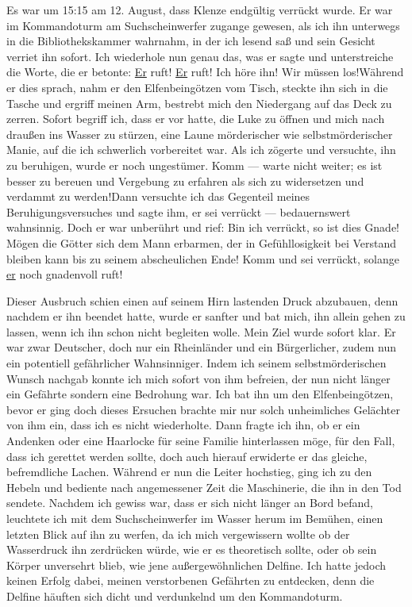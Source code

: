 \documentclass[a4paper]{memoir}
\begin{document}
Es war um 15:15 am 12. August, dass Klenze endgültig verrückt wurde. Er war im Kommandoturm am Suchscheinwerfer zugange gewesen, als ich ihn unterwegs in die Bibliothekskammer wahrnahm, in der ich lesend saß und sein Gesicht verriet ihn sofort. Ich wiederhole nun genau das, was er sagte und unterstreiche die Worte, die er betonte: \glqq\underline{Er} ruft! \underline{Er} ruft! Ich höre ihn! Wir müssen los!\grqq Während er dies sprach, nahm er den Elfenbeingötzen vom Tisch, steckte ihn sich in die Tasche und ergriff meinen Arm, bestrebt mich den Niedergang auf das Deck zu zerren. Sofort begriff ich, dass er vor hatte, die Luke zu öffnen und mich nach draußen ins Wasser zu stürzen, eine Laune mörderischer wie selbstmörderischer Manie, auf die ich schwerlich vorbereitet war. Als ich zögerte und versuchte, ihn zu beruhigen, wurde er noch ungestümer. \glqq Komm --- warte nicht weiter; es ist besser zu bereuen und Vergebung zu erfahren als sich zu widersetzen und verdammt zu werden!\grqq Dann versuchte ich das Gegenteil meines Beruhigungsversuches und sagte ihm, er sei verrückt --- bedauernswert wahnsinnig. Doch er war unberührt und rief: \glqq Bin ich verrückt, so ist dies Gnade! Mögen die Götter sich dem Mann erbarmen, der in Gefühllosigkeit bei Verstand bleiben kann bis zu seinem abscheulichen Ende! Komm und sei verrückt, solange \underline{er} noch gnadenvoll ruft!\grqq

Dieser Ausbruch schien einen auf seinem Hirn lastenden Druck abzubauen, denn nachdem er ihn beendet hatte, wurde er sanfter und bat mich, ihn allein gehen zu lassen, wenn ich ihn schon nicht begleiten wolle. Mein Ziel wurde sofort klar. Er war zwar Deutscher, doch nur ein Rheinländer und ein Bürgerlicher, zudem nun ein potentiell gefährlicher Wahnsinniger. Indem ich seinem selbstmörderischen Wunsch nachgab konnte ich mich sofort von ihm befreien, der nun nicht länger ein Gefährte sondern eine Bedrohung war. Ich bat ihn um den Elfenbeingötzen, bevor er ging doch dieses Ersuchen brachte mir nur solch unheimliches Gelächter von ihm ein, dass ich es nicht wiederholte. Dann fragte ich ihn, ob er ein Andenken oder eine Haarlocke für seine Familie hinterlassen möge, für den Fall, dass ich gerettet werden sollte, doch auch hierauf erwiderte er das gleiche, befremdliche Lachen. Während er nun die Leiter hochstieg, ging ich zu den Hebeln und bediente nach angemessener Zeit die Maschinerie, die ihn in den Tod sendete. Nachdem ich gewiss war, dass er sich nicht länger an Bord befand, leuchtete ich mit dem Suchscheinwerfer im Wasser herum im Bemühen, einen letzten Blick auf ihn zu werfen, da ich mich vergewissern wollte ob der Wasserdruck ihn zerdrücken würde, wie er es theoretisch sollte, oder ob sein Körper unversehrt blieb, wie jene außergewöhnlichen Delfine. Ich hatte jedoch keinen Erfolg dabei, meinen verstorbenen Gefährten zu entdecken, denn die Delfine häuften sich dicht und verdunkelnd um den Kommandoturm.
\end{document}

